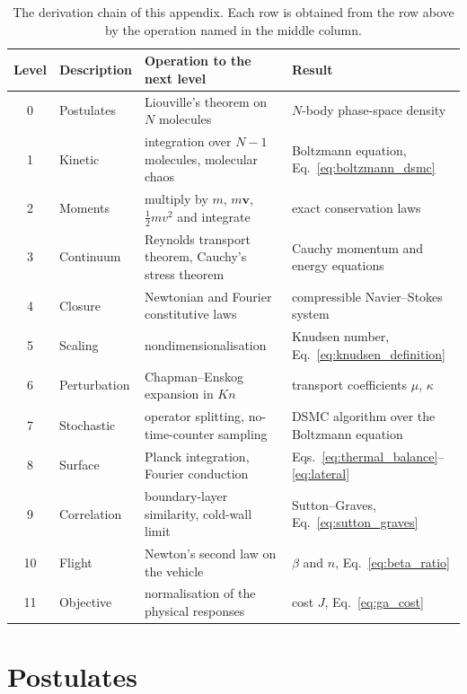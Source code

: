 \begin{table}[H]
\centering
\caption{The derivation chain of this appendix. Each row is obtained from the row above by the operation named in the middle column.}
\label{tab:app_chain}
\begin{tabularx}{\textwidth}{@{}c >{\RaggedRight\arraybackslash}p{} >{\RaggedRight\arraybackslash}X >{\RaggedRight\arraybackslash}p{}@{}}
\toprule
\textbf{Level} & \textbf{Description} & \textbf{Operation to the next level} & \textbf{Result} \\
\midrule
0 & Postulates & Liouville's theorem on $N$ molecules & $N$-body phase-space density \\
1 & Kinetic & integration over $N-1$ molecules, molecular chaos & Boltzmann equation, Eq.~\eqref{eq:boltzmann_dsmc} \\
2 & Moments & multiply by $m$, $m\mathbf{v}$, $\tfrac12 m v^2$ and integrate & exact conservation laws \\
3 & Continuum & Reynolds transport theorem, Cauchy's stress theorem & Cauchy momentum and energy equations \\
4 & Closure & Newtonian and Fourier constitutive laws & compressible Navier--Stokes system \\
5 & Scaling & nondimensionalisation & Knudsen number, Eq.~\eqref{eq:knudsen_definition} \\
6 & Perturbation & Chapman--Enskog expansion in $Kn$ & transport coefficients $\mu$, $\kappa$ \\
7 & Stochastic & operator splitting, no-time-counter sampling & DSMC algorithm over the Boltzmann equation \\
8 & Surface & Planck integration, Fourier conduction & Eqs.~\eqref{eq:thermal_balance}--\eqref{eq:lateral} \\
9 & Correlation & boundary-layer similarity, cold-wall limit & Sutton--Graves, Eq.~\eqref{eq:sutton_graves} \\
10 & Flight & Newton's second law on the vehicle & $\beta$ and $n$, Eq.~\eqref{eq:beta_ratio} \\
11 & Objective & normalisation of the physical responses & cost $J$, Eq.~\eqref{eq:ga_cost} \\
\bottomrule
\end{tabularx}
\end{table}

\section{Postulates}
\label{app:postulates}

